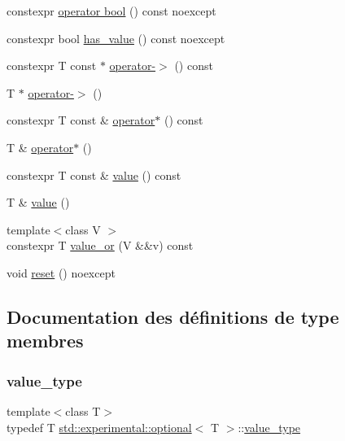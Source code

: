 \begin{DoxyCompactItemize}
\item 
constexpr \hyperlink{classstd_1_1experimental_1_1optional_ac97eb00f6c8eb86920755ca75c31c24c}{operator bool} () const noexcept
\item 
constexpr bool \hyperlink{classstd_1_1experimental_1_1optional_a98002656a42c0339158cc0bce10c89a4}{has\+\_\+value} () const noexcept
\item 
constexpr T const  $\ast$ \hyperlink{classstd_1_1experimental_1_1optional_af0dc4f70b9e9948d7e3fc6f3d3cb93a4}{operator-\/$>$} () const
\item 
T $\ast$ \hyperlink{classstd_1_1experimental_1_1optional_ae600987ec09d6e04e894ddbe5f0a0b3f}{operator-\/$>$} ()
\item 
constexpr T const  \& \hyperlink{classstd_1_1experimental_1_1optional_a33265a6fff3cc57577805adc1fc433e5}{operator$\ast$} () const
\item 
T \& \hyperlink{classstd_1_1experimental_1_1optional_aba547a62e0c8e3cc7d3fcf152e31d56e}{operator$\ast$} ()
\item 
constexpr T const  \& \hyperlink{classstd_1_1experimental_1_1optional_ad1277f09c288255dfe102b72e7107be6}{value} () const
\item 
T \& \hyperlink{classstd_1_1experimental_1_1optional_a2278733d39a8c6b6c032f080b5ca0644}{value} ()
\item 
{\footnotesize template$<$class V $>$ }\\constexpr T \hyperlink{classstd_1_1experimental_1_1optional_a7556c77490cf4fc004291fc7c6696967}{value\+\_\+or} (V \&\&v) const
\item 
void \hyperlink{classstd_1_1experimental_1_1optional_a6ce77ba1776c86de36a5ae1d16dfd80f}{reset} () noexcept
\end{DoxyCompactItemize}


\subsection{Documentation des définitions de type membres}
\mbox{\label{classstd_1_1experimental_1_1optional_a3b480b4a74492ffdbcc9d8529ed512fc}} 
\subsubsection{\texorpdfstring{value\+\_\+type}{value\_type}}
{\footnotesize\ttfamily template$<$class T$>$ \\
typedef T \hyperlink{classstd_1_1experimental_1_1optional}{std\+::experimental\+::optional}$<$ T $>$\+::\hyperlink{classstd_1_1experimental_1_1optional_a3b480b4a74492ffdbcc9d8529ed512fc}{value\+\_\+type}}



